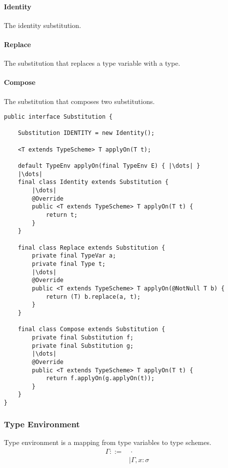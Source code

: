\documentclass[a4paper]{article}
\begin{document}
\paragraph{Identity} The identity substitution.
\paragraph{Replace} The substitution that replaces a type variable with a type.
\paragraph{Compose} The substitution that composes two substitutions.

\begin{verbatim}
public interface Substitution {

    Substitution IDENTITY = new Identity();

    <T extends TypeScheme> T applyOn(T t);

    default TypeEnv applyOn(final TypeEnv E) { |\dots| }
    |\dots|
    final class Identity extends Substitution { 
        |\dots|
        @Override
        public <T extends TypeScheme> T applyOn(T t) {
            return t;
        }
    }

    final class Replace extends Substitution {
        private final TypeVar a;
        private final Type t;
        |\dots|
        @Override
        public <T extends TypeScheme> T applyOn(@NotNull T b) {
            return (T) b.replace(a, t);
        }
    }

    final class Compose extends Substitution {
        private final Substitution f;
        private final Substitution g;
        |\dots|
        @Override
        public <T extends TypeScheme> T applyOn(T t) {
            return f.applyOn(g.applyOn(t));
        }
    }
}
\end{verbatim}

\subsubsection{Type Environment}

Type environment is a mapping from type variables to type schemes.
\begin{align*}
    \Gamma ::= & \ \boldsymbol{\cdot} \\
               & | \Gamma, x: \sigma
\end{align*}
\end{document}
